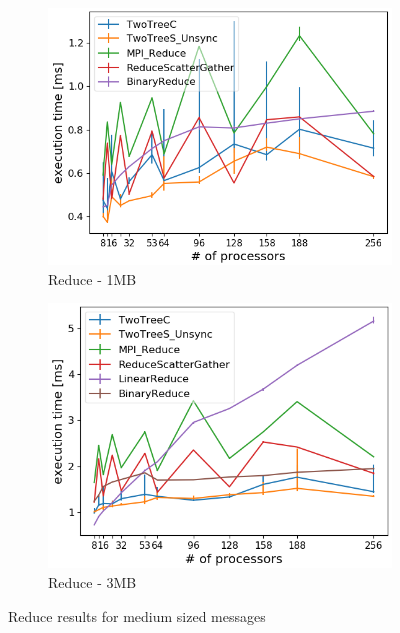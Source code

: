 \documentclass[sigplan,review,anonymous]{acmart}\settopmatter{printfolios=true,printccs=false,printacmref=false}
\begin{document}
\begin{figure}
\centering
\begin{subfigure}{.25\textwidth}
  \centering
  \includegraphics[width=1\linewidth]{images/Results/reducefinal_1048576B.png}
  \caption{Reduce - 1MB}
  \label{reduce-selected-1MB}
\end{subfigure}%
\begin{subfigure}{.25\textwidth}
  \centering
  \includegraphics[width=1\linewidth]{images/Results/reducefinallinear_3145728B.png}
  \caption{Reduce - 3MB}
  \label{reduce-selected-3MB}
\end{subfigure}
\caption{Reduce results for medium sized messages}
\label{graph-reduce-medium1-selected}
\end{figure}
\end{document}
